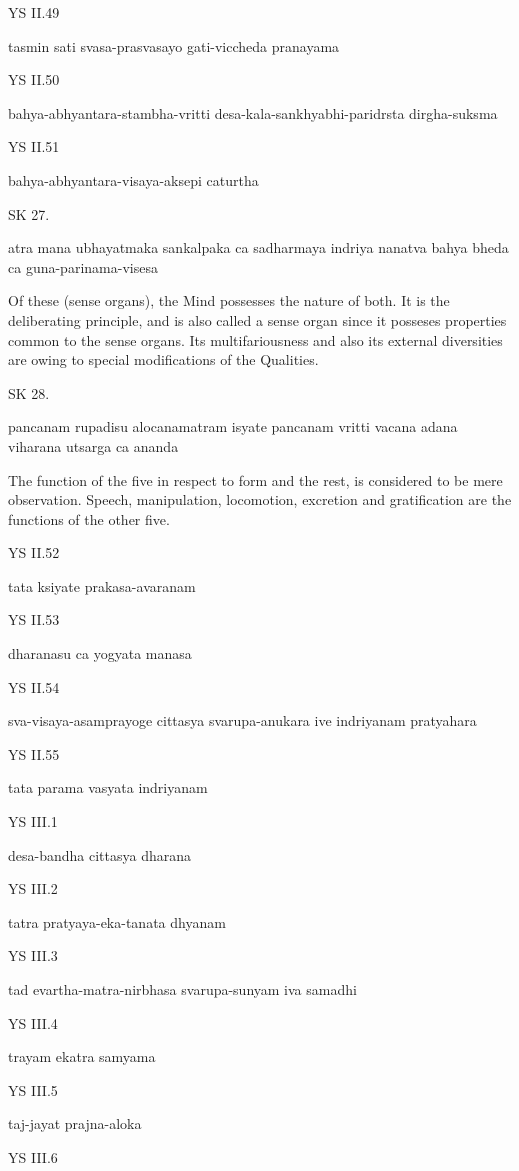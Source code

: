YS II.49

    tasmin sati svasa-prasvasayo gati-viccheda pranayama

YS II.50

    bahya-abhyantara-stambha-vritti
    desa-kala-sankhyabhi-paridrsta dirgha-suksma

YS II.51

    bahya-abhyantara-visaya-aksepi caturtha

SK 27.

atra mana ubhayatmaka sankalpaka ca sadharmaya indriya
nanatva bahya bheda ca guna-parinama-visesa

Of these (sense organs), the Mind possesses the nature of both.
It is the deliberating principle, and is also called a sense organ
since it posseses properties common to the sense organs.
Its multifariousness and also its external diversities are owing
to special modifications of the Qualities.

SK 28.

pancanam rupadisu alocanamatram isyate
pancanam vritti vacana adana viharana utsarga ca ananda

The function of the five in respect to form and the rest,
is considered to be mere observation.
Speech, manipulation, locomotion, excretion and gratification
are the functions of the other five.

YS II.52

    tata ksiyate prakasa-avaranam

YS II.53

    dharanasu ca yogyata manasa

YS II.54

    sva-visaya-asamprayoge cittasya svarupa-anukara ive indriyanam pratyahara

YS II.55

    tata parama vasyata indriyanam

YS III.1

    desa-bandha cittasya dharana

YS III.2

    tatra pratyaya-eka-tanata dhyanam

YS III.3

    tad evartha-matra-nirbhasa svarupa-sunyam iva samadhi

YS III.4

    trayam ekatra samyama

YS III.5

    taj-jayat prajna-aloka

YS III.6


